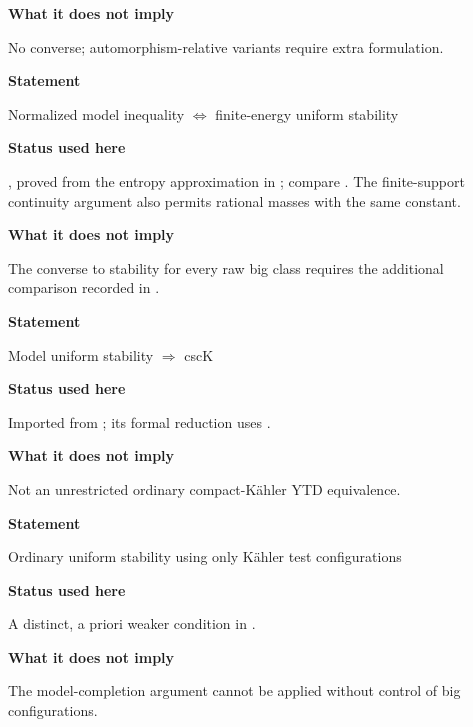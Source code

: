 \textbf{What it does not imply}\par\nopagebreak
No converse; automorphism-relative variants require extra formulation.

\medskip
\textbf{Statement}\par\nopagebreak
Normalized model inequality
$\Leftrightarrow$ finite-energy uniform stability\par\nopagebreak

\textbf{Status used here}\par\nopagebreak
{}, proved from the entropy
approximation in ; compare
\cite[Theorem~9.2.1, pp.~34--35]{MPWN25}. The finite-support
continuity argument also permits rational masses with the same
constant.\par\nopagebreak

\textbf{What it does not imply}\par\nopagebreak
The converse to stability for every raw big class requires the
additional comparison recorded in
.

\medskip
\textbf{Statement}\par\nopagebreak
Model uniform stability
$\Rightarrow$ cscK\par\nopagebreak

\textbf{Status used here}\par\nopagebreak
Imported from \cite[Corollary~9.2.2]{MPWN25}; its formal reduction uses
\cite[Theorems~9.2.1 and 2.4.3]{MPWN25}.\par\nopagebreak

\textbf{What it does not imply}\par\nopagebreak
Not an unrestricted ordinary compact-K\"ahler YTD equivalence.

\medskip
\textbf{Statement}\par\nopagebreak
Ordinary uniform stability using only K\"ahler test configurations\par\nopagebreak

\textbf{Status used here}\par\nopagebreak
A distinct, a priori weaker condition in
\cite[Definition~1.1.2]{MPWN25}.\par\nopagebreak

\textbf{What it does not imply}\par\nopagebreak
The model-completion argument cannot be applied without control of big
configurations.

\endgroup

